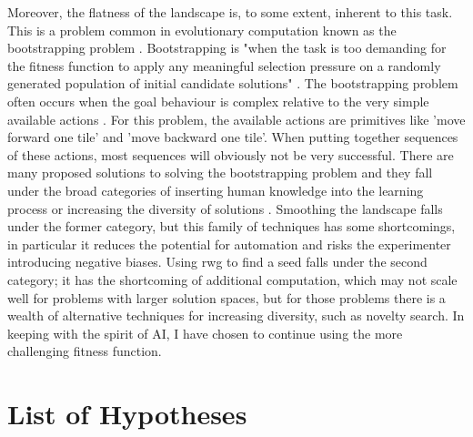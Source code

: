 \documentclass[12pt]{article}
\begin{document}
Moreover, the flatness of the landscape is, to some extent, inherent to this task.
This is a problem common in evolutionary computation known as the bootstrapping problem \cite{Silva:EC:2016, Wei:ALR:2019}.
Bootstrapping is "when the task is too demanding for the fitness function to apply any meaningful selection pressure on a randomly generated population of initial candidate solutions" \cite{Silva:EC:2016}.
The bootstrapping problem often occurs when the goal behaviour is complex relative to the very simple available actions \cite{Wei:ALR:2019}.
For this problem, the available actions are primitives like 'move forward one tile' and 'move backward one tile'.
When putting together sequences of these actions, most sequences will obviously not be very successful.
There are many proposed solutions to solving the bootstrapping problem and they fall under the broad categories of inserting human knowledge into the learning process or increasing the diversity of solutions \cite{Silva:EC:2016}.
Smoothing the landscape falls under the former category, but this family of techniques has some shortcomings, in particular it reduces the potential for automation and risks the experimenter introducing negative biases.
Using rwg to find a seed falls under the second category; it has the shortcoming of additional computation, which may not scale well for problems with larger solution spaces, but for those problems there is a wealth of alternative techniques for increasing diversity, such as novelty search.
In keeping with the spirit of AI, I have chosen to continue using the more challenging fitness function.

\section{List of Hypotheses}
\end{document}

